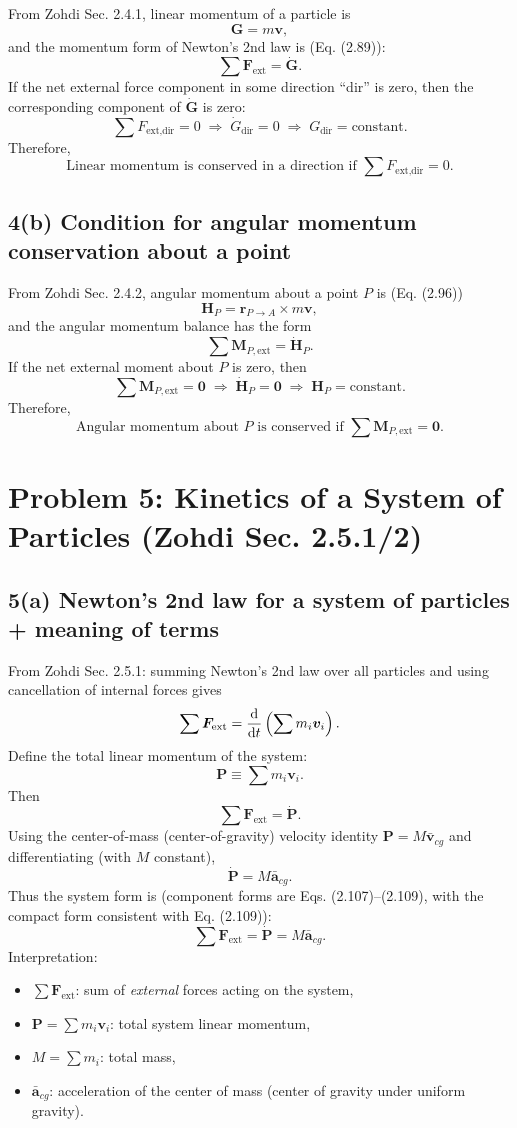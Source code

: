 \documentclass[12pt]{article}
\begin{document}
From Zohdi Sec. 2.4.1, linear momentum of a particle is
\[
\bm G = m\bm v,
\]
and the momentum form of Newton's 2nd law is (Eq. (2.89)):
\[
\sum \bm F_{\text{ext}} = \dot{\bm G}.
\]
If the net external force component in some direction ``dir'' is zero, then the corresponding
component of $\dot{\bm G}$ is zero:
\[
\sum F_{\text{ext,dir}} = 0 \;\Rightarrow\; \dot G_{\text{dir}}=0 \;\Rightarrow\; G_{\text{dir}}=\text{constant}.
\]
Therefore,
\[
\boxed{\text{Linear momentum is conserved in a direction if } \sum F_{\text{ext,dir}}=0.}
\]

\subsection*{4(b) Condition for angular momentum conservation about a point}

From Zohdi Sec. 2.4.2, angular momentum about a point $P$ is (Eq. (2.96))
\[
\bm H_P = \bm r_{P\to A}\times m\bm v,
\]
and the angular momentum balance has the form
\[
\sum \bm M_{P,\text{ext}} = \dot{\bm H}_P.
\]
If the net external moment about $P$ is zero, then
\[
\sum \bm M_{P,\text{ext}}=\bm 0 \;\Rightarrow\; \dot{\bm H}_P=\bm 0 \;\Rightarrow\; \bm H_P=\text{constant}.
\]
Therefore,
\[
\boxed{\text{Angular momentum about }P\text{ is conserved if }\sum \bm M_{P,\text{ext}}=\bm 0.}
\]

\newpage
\section*{Problem 5: Kinetics of a System of Particles (Zohdi Sec. 2.5.1/2)}

\subsection*{5(a) Newton's 2nd law for a system of particles + meaning of terms}

From Zohdi Sec. 2.5.1: summing Newton's 2nd law over all particles and using cancellation of internal forces gives
\[
\sum \bm F_{\text{ext}} = \dv{}{t}\left(\sum m_i \bm v_i\right).
\]
Define the total linear momentum of the system:
\[
\bm P \equiv \sum m_i \bm v_i.
\]
Then
\[
\sum \bm F_{\text{ext}} = \dot{\bm P}.
\]
Using the center-of-mass (center-of-gravity) velocity identity $\bm P=M\bar{\bm v}_{cg}$ and differentiating (with $M$ constant),
\[
\dot{\bm P} = M\bar{\bm a}_{cg}.
\]
Thus the system form is (component forms are Eqs. (2.107)--(2.109), with the compact form consistent with Eq. (2.109)):
\[
\boxed{\sum \bm F_{\text{ext}} = \dot{\bm P} = M\bar{\bm a}_{cg}.}
\]
Interpretation:
\begin{itemize}
\item $\sum \bm F_{\text{ext}}$: sum of \emph{external} forces acting on the system,
\item $\bm P=\sum m_i\bm v_i$: total system linear momentum,
\item $M=\sum m_i$: total mass,
\item $\bar{\bm a}_{cg}$: acceleration of the center of mass (center of gravity under uniform gravity).
\end{itemize}
\end{document}
